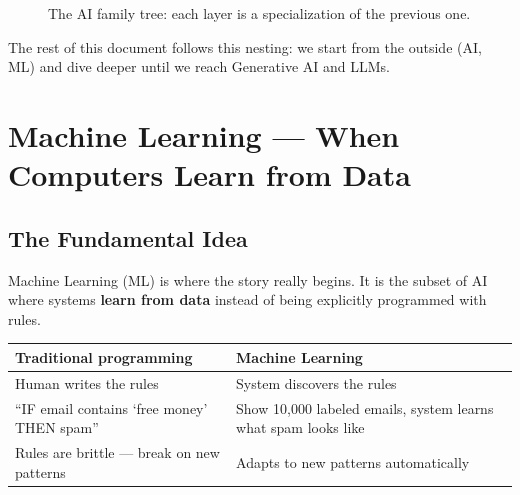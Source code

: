 \documentclass[11pt,a4paper]{report}
\begin{document}
\begin{figure}[h]
\centering
{}
\caption{The AI family tree: each layer is a specialization of the previous one.}
\label{fig:ai-family}
\end{figure}

The rest of this document follows this nesting: we start from the outside (AI, ML) and dive deeper until we reach Generative AI and LLMs.

\chapter{Machine Learning --- When Computers Learn from Data}

\section{The Fundamental Idea}

Machine Learning (ML) is where the story really begins. It is the subset of AI where systems \textbf{learn from data} instead of being explicitly programmed with rules.

\begin{table}[h]
\centering
\begin{tabularx}{\textwidth}{X X}
\toprule
\textbf{Traditional programming} & \textbf{Machine Learning} \\
\midrule
Human writes the rules & System discovers the rules \\
``IF email contains `free money' THEN spam'' & Show 10,000 labeled emails, system learns what spam looks like \\
Rules are brittle --- break on new patterns & Adapts to new patterns automatically \\
\bottomrule
\end{tabularx}
\end{table}
\end{document}
